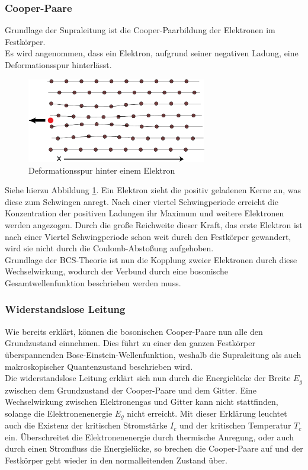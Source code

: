         \subsubsection{Cooper-Paare}
Grundlage der Supraleitung ist die Cooper-Paarbildung der Elektronen im Festkörper.
\vspace{3pt}\\
Es wird angenommen, dass ein Elektron, aufgrund seiner negativen Ladung, eine 
Deformationsspur hinterlässt. 
\begin{figure}[h]
    \centering
    \includegraphics[width=0.7\textwidth]{Abb/deformation.pdf}
    \caption{Deformationsspur hinter einem Elektron}
    \label{Abb:def}
\end{figure}
Siehe hierzu Abbildung \ref{Abb:def}. Ein Elektron zieht die positiv geladenen Kerne
an, was diese zum Schwingen anregt. Nach einer viertel Schwingperiode erreicht die
Konzentration der positiven Ladungen ihr Maximum und weitere Elektronen werden 
angezogen. Durch die große Reichweite dieser Kraft, das erste Elektron ist nach
einer Viertel Schwingperiode schon weit durch den Festkörper gewandert, wird sie
nicht durch die Coulomb-Abstoßung aufgehoben.
\vspace{3pt}\\
Grundlage der BCS-Theorie ist nun die Kopplung zweier Elektronen durch diese 
Wechselwirkung, wodurch der Verbund durch eine bosonische Gesamtwellenfunktion
beschrieben werden muss.

		\subsubsection{Widerstandslose Leitung}
Wie bereits erklärt, können die bosonischen Cooper-Paare nun alle den Grundzustand
einnehmen. Dies führt zu einer den ganzen Festkörper überspannenden 
Bose-Einstein-Wellenfunktion, weshalb die Supraleitung als auch makroskopischer
Quantenzustand beschrieben wird. \\
Die widerstandslose Leitung erklärt sich nun durch die Energielücke der Breite 
$E_g$ zwischen dem Grundzustand der Cooper-Paare und dem Gitter. Eine Wechselwirkung
zwischen Elektronengas und Gitter kann nicht stattfinden, solange die 
Elektronenenergie $E_g$ nicht erreicht. Mit dieser Erklärung leuchtet auch die 
Existenz der kritischen Stromstärke $I_c$ und der kritischen Temperatur $T_c$ ein.
Überschreitet die Elektronenenergie durch thermische Anregung, oder auch durch
einen Stromfluss die Energielücke, so brechen die Cooper-Paare auf und der 
Festkörper geht wieder in den normalleitenden Zustand über.\\

